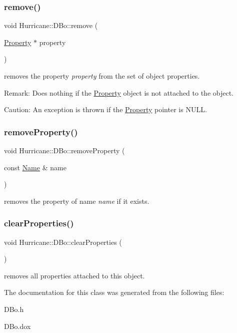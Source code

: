 \subsubsection{\texorpdfstring{remove()}{remove()}}
{\footnotesize\ttfamily void Hurricane\+::\+D\+Bo\+::remove (\begin{DoxyParamCaption}\item[{\hyperlink{classHurricane_1_1Property}{Property} $\ast$}]{property }\end{DoxyParamCaption})}

removes the property {\itshape property} from the set of object properties.

\begin{DoxyParagraph}{Remark\+:}
Does nothing if the \hyperlink{classHurricane_1_1Property}{Property} object is not attached to the object.
\end{DoxyParagraph}
\begin{DoxyParagraph}{Caution\+:}
An exception is thrown if the \hyperlink{classHurricane_1_1Property}{Property} pointer is {\ttfamily N\+U\+LL}. 
\end{DoxyParagraph}
\mbox{\label{classHurricane_1_1DBo_ac35fbb8303b1a78db5ca0fc831fb6a0c}} 
\subsubsection{\texorpdfstring{remove\+Property()}{removeProperty()}}
{\footnotesize\ttfamily void Hurricane\+::\+D\+Bo\+::remove\+Property (\begin{DoxyParamCaption}\item[{const \hyperlink{classHurricane_1_1Name}{Name} \&}]{name }\end{DoxyParamCaption})}

removes the property of name {\itshape name} if it exists. \mbox{\label{classHurricane_1_1DBo_a3e02f3d665cb0b2120df2fdfe9c3df4f}} 
\subsubsection{\texorpdfstring{clear\+Properties()}{clearProperties()}}
{\footnotesize\ttfamily void Hurricane\+::\+D\+Bo\+::clear\+Properties (\begin{DoxyParamCaption}{ }\end{DoxyParamCaption})}

removes all properties attached to this object. 

The documentation for this class was generated from the following files\+:\begin{DoxyCompactItemize}
\item 
D\+Bo.\+h\item 
D\+Bo.\+dox\end{DoxyCompactItemize}

